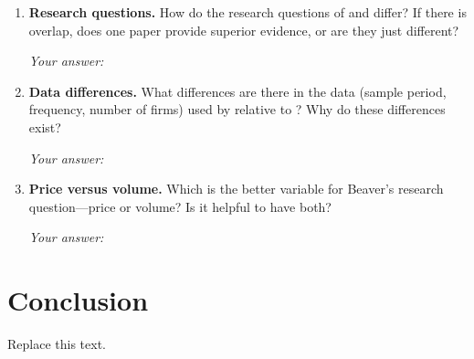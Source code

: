 \documentclass[12pt]{article}
\begin{document}
\begin{enumerate}

\item \textbf{Research questions.}
How do the research questions of \citet{beaver1968} and
\citet{ballbrown1968} differ? If there is overlap, does one paper provide
superior evidence, or are they just different?

\medskip\noindent\textit{Your answer:}

\medskip

\item \textbf{Data differences.}
What differences are there in the data (sample period, frequency, number
of firms) used by \citet{beaver1968} relative to \citet{ballbrown1968}?
Why do these differences exist?

\medskip\noindent\textit{Your answer:}

\medskip

\item \textbf{Price versus volume.}
Which is the better variable for Beaver's research question---price or
volume? Is it helpful to have both?

\medskip\noindent\textit{Your answer:}

\medskip

\end{enumerate}


\section{Conclusion}

Replace this text.



\end{document}
